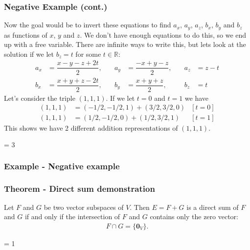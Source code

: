 \documentclass[usenames,dvipsnames,aspectratio=169,10pt]{beamer}
\def \EXAMPLEVERSION {1} %
\numberwithin{equation}{section}
\begin{document}
\begin{frame}
\frametitle{Negative Example (cont.)}
Now the goal would be to invert these equations to find $a_x$, $a_y$, $a_z$, $b_x$, $b_y$ and $b_z$ as functions of $x$, $y$ and $z$. We don't have enough equations to do this, so we end up with a free variable. There are infinite ways to write this, but lets look at the solution if we let $b_z=t$ for some $t\in \mathbb{R}$:
\begin{align*}
a_x &= \dfrac{x-y-z+2t}{2}, &\quad a_y &= \dfrac{-x+y-z}{2}, &\quad a_z &= z-t  \\
b_x &= \dfrac{x+y+z-2t}{2}, &\quad b_y &= \dfrac{x+y+z}{2},  &\quad b_z &= t
\end{align*}
Let's consider the triple $(1,1,1)$. If we let $t=0$ and $t=1$ we have
\begin{align*}
(1,1,1) &= (-1/2,-1/2,1) + (3/2,3/2,0) & [t=0] \\
(1,1,1) &= (1/2,-1/2,0) + (1/2,3/2,1)  & [t=1] 
\end{align*}
This shows we have 2 different addition representations of $(1,1,1)$.
\end{frame}
\fi



\ifnum \EXAMPLEVERSION = 3
\begin{frame}
\frametitle{Example - Negative example}
\end{frame}
\fi


\begin{frame}
\frametitle{Theorem - Direct sum demonstration}

Let $F$ and $G$ be two vector subspaces of $V$. Then $E=F+G$ is a direct sum of $F$ and $G$ if and only if the intersection of $F$ and $G$ contains only the zero vector:
\begin{align*}
F \cap G = \{\textbf{0}_V \}.
\end{align*}

\end{frame}

\ifnum \EXAMPLEVERSION = 1
\end{document}
